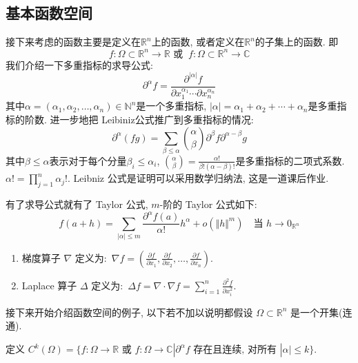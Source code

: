 \documentclass[11pt]{ctexart}[UTF8]
\begin{document}
\subsection{基本函数空间}
接下来考虑的函数主要是定义在$\mathbb{R}^n$上的函数, 或者定义在$\mathbb{R}^n$的子集上的函数. 即
\begin{equation*}
    f : \Omega \subset \mathbb{R}^n \to \mathbb{R} \text{ 或 }\  f : \Omega \subset \mathbb{R}^n \to \mathbb{C}
\end{equation*}
我们介绍一下多重指标的求导公式:
\begin{equation*}
    \partial^\alpha f = \frac{\partial^{|\alpha|} f}{\partial x_1^{\alpha_1} \cdots \partial x_n^{\alpha_n}}
\end{equation*}
其中$\alpha = (\alpha_1, \alpha_2, \ldots, \alpha_n) \in \mathbb{N}^{n}$是一个多重指标, $|\alpha| = \alpha_1 + \alpha_2 + \cdots + \alpha_n$是多重指标的阶数.
进一步地把 Leibiniz公式推广到多重指标的情况:
\begin{equation*}
    \partial^{\alpha} (fg) = \sum\limits_{\beta \leq \alpha} \binom{\alpha}{\beta} \partial^{\beta} f \partial^{\alpha - \beta} g
\end{equation*}
其中$\beta \leq \alpha$表示对于每个分量$\beta_i \leq \alpha_i$, $\binom{\alpha}{\beta} = \frac{\alpha!}{\beta! (\alpha - \beta)!}$是多重指标的二项式系数. $\alpha !=\prod\limits_{j=1}^{n}\alpha_{j}!$.
Leibniz 公式是证明可以采用数学归纳法, 这是一道课后作业.\par
有了求导公式就有了 Taylor 公式, $m$-阶的 Taylor 公式如下:
\begin{equation*}
    f(a+h) = \sum\limits_{|\alpha| \leq m} \frac{\partial^{\alpha} f(a)}{\alpha!} h^\alpha + o(\Vert h \Vert^m)\quad \text{当 } h \to 0_{\mathbb{R}^n}
\end{equation*}
\begin{enumerate}
    \item 梯度算子 $\nabla$ 定义为:\  $\nabla f = \left( \frac{\partial f}{\partial x_1}, \frac{\partial f}{\partial x_2}, \ldots, \frac{\partial f}{\partial x_n} \right)$.
    \item Laplace 算子 $\Delta$ 定义为:\  $\Delta f = \nabla \cdot \nabla f = \sum\limits_{i=1}^n \frac{\partial^2 f}{\partial x_i^2}$.
\end{enumerate}
接下来开始介绍函数空间的例子, 以下若不加以说明都假设 $\Omega \subset \mathbb{R}^n$ 是一个开集(连通).
\begin{definition}[k阶连续可微函数空间]
    定义 $C^k(\Omega) = \{ f : \Omega \to \mathbb{R} \text{ 或 } f : \Omega \to \mathbb{C} | \partial^{\alpha} f \text{ 存在且连续, 对所有 } |\alpha| \leq k \}$.
\end{definition}
\end{document}
